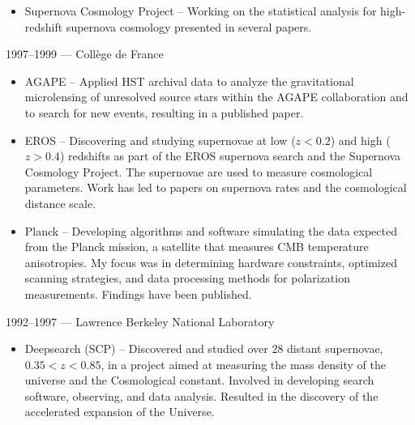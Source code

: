 \documentclass[line, margin]{res}
\begin{document}
\begin{resume}
\begin{itemize}
\item Supernova Cosmology Project -- Working on the statistical analysis for high-redshift supernova cosmology presented in
several papers.
\end{itemize}
1997--1999 --- Coll\`ege de France
\begin{itemize}
\item AGAPE -- Applied
 HST archival data to analyze the gravitational microlensing of unresolved
source stars within the AGAPE collaboration and to search for new events,  resulting in a published paper.
\item EROS -- Discovering and studying supernovae at low ($z<0.2$) and high ($z > 0.4$)
redshifts as part of the EROS supernova search and the Supernova Cosmology
Project.  The supernovae are used to measure cosmological parameters. Work has led to papers on
supernova rates and the cosmological distance scale.
\item Planck -- Developing algorithms and software simulating the data expected from
the Planck mission, a satellite that measures CMB temperature
anisotropies.  My focus was in determining hardware constraints, optimized scanning strategies, and data processing
methods for polarization measurements. Findings have been published.
\end{itemize}
1992--1997 --- Lawrence Berkeley National Laboratory
\begin{itemize}
\item Deepsearch (SCP) -- Discovered and studied over 28 distant supernovae, $0.35< z < 0.85$, in a
 project aimed at measuring the mass density of the universe and the
 Cosmological constant.  Involved in developing search software, observing,
 and data analysis.  Resulted in the discovery of the accelerated expansion of the Universe.
\end{itemize}
%

\end{resume}
\end{document}
